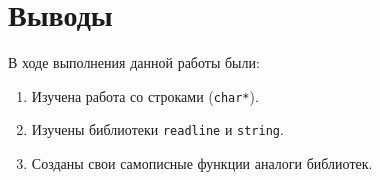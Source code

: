 \section{Выводы}

В ходе выполнения данной работы были:

\begin{enumerate}
  \item Изучена работа со строками (\texttt{char*}).
  \item Изучены библиотеки \texttt{readline} и \texttt{string}.
  \item Созданы свои самописные функции аналоги библиотек.
\end{enumerate}